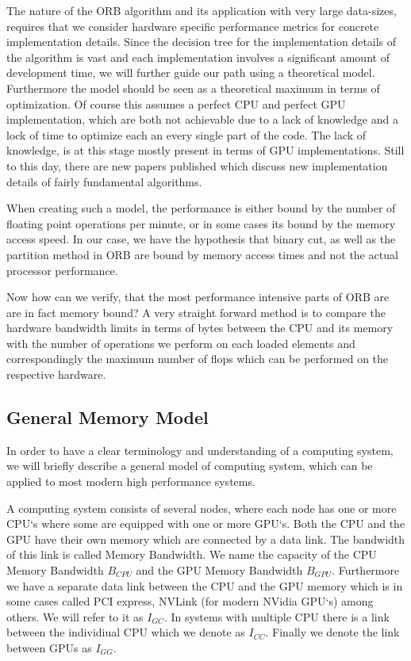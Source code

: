 \documentclass[]{article}
\begin{document}
The nature of the ORB algorithm and its application with very large data-sizes, requires that we consider hardware specific performance metrics for concrete implementation details. Since the decision tree for the implementation details of the algorithm is vast and each implementation involves a significant amount of development time, we will further guide our path using a theoretical model. Furthermore the model should be seen as a theoretical maximum in terms of optimization. Of course this assumes a perfect CPU and perfect GPU implementation, which are both not achievable due to a lack of knowledge and a lock of time to optimize each an every single part of the code. The lack of knowledge, is at this stage mostly present in terms of GPU implementations. Still to this day, there are new papers published which discuss new implementation details of fairly fundamental algorithms. 

When creating such a model, the performance is either bound by the number of floating point operations per minute, or in some cases its bound by the memory access speed. In our case, we have the hypothesis that binary cut, as well as the partition method in ORB are bound by memory access times and not the actual processor performance.

Now how can we verify, that the most performance intensive parts of ORB are are in fact memory bound? A very straight forward method is to compare the hardware bandwidth limits in terms of bytes between the CPU and its memory with the number of operations we perform on each loaded elements and correspondingly the maximum number of flops which can be performed on the respective hardware.


\subsection{General Memory Model}\label{sec:gmm}

In order to have a clear terminology and understanding of a computing system, we will briefly describe a general model of computing system, which can be applied to most modern high performance systems.

A computing system consists of several nodes, where each node has one or more CPU`s where some are equipped with one or more GPU`s. Both the CPU and the GPU have their own memory which are connected by a data link. The bandwidth of this link is called Memory Bandwidth. We name the capacity of the CPU Memory Bandwidth $B_{CPU}$ and the GPU Memory Bandwidth $B_{GPU}$. Furthermore we have a separate data link between the CPU and the GPU memory which is in some cases called PCI express, NVLink (for modern NVidia GPU`s) among others. We will refer to it as $I_{GC}$. In systems with multiple CPU there is a link between the individiual CPU which we denote as $I_{CC}$. Finally we denote the link between GPUs as $I_{GG}$.
\end{document}
